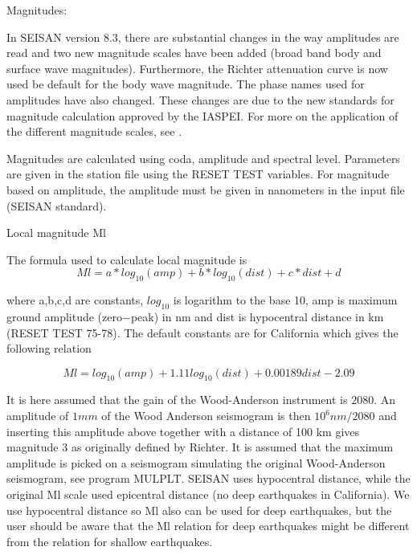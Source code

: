 Magnitudes: 

In SEISAN version 8.3, there are substantial changes in the way amplitudes are 
read and two new magnitude scales have been added (broad band body 
and surface wave magnitudes). Furthermore, the Richter attenuation 
curve is now used be default for the body wave magnitude. The phase 
names used for amplitudes have also changed. These changes are due 
to the new standards for magnitude calculation approved by the IASPEI. 
For more on the application of the different magnitude scales, 
see \cite{havskov2010}.   %

Magnitudes are calculated using coda, amplitude and spectral level. Parameters are given in the station file using the RESET TEST variables. For magnitude based on amplitude, the amplitude must be given in nanometers in the input file (SEISAN standard). 

Local magnitude Ml

The formula used to calculate local magnitude 
is 
\begin{displaymath}
Ml = a * log_{10} (amp) + b*log_{10}(dist) + c*dist + d 
\end{displaymath}

where a,b,c,d are constants, $log_{10}$ is logarithm to the base 10, 
amp is maximum ground amplitude (zero$-$peak) in nm and dist is 
hypocentral distance in km (RESET TEST 75-78). The default 
constants are for California \citep{hutton1987} which 
gives the following relation 

\begin{displaymath}
Ml = log_{10}(amp) + 1.11 log_{10}(dist) + 0.00189 dist - 2.09 
\end{displaymath}

It is here assumed that the gain of the Wood-Anderson instrument is 
$2080$. An amplitude of $1 mm$ of the Wood Anderson seismogram is 
then $10^6nm/2080$ and inserting this amplitude above together with 
a distance of 100 km gives magnitude 3 as originally defined by Richter. 
It is assumed that the maximum amplitude is picked on a seismogram 
simulating the original Wood-Anderson seismogram, see program MULPLT. 
SEISAN uses hypocentral distance, while the original Ml scale used 
epicentral distance (no deep earthquakes in California). We use 
hypocentral distance so Ml also can be used for deep earthquakes, 
but the user should be aware that the Ml relation for deep earthquakes 
might be different from the relation for shallow earthquakes.

